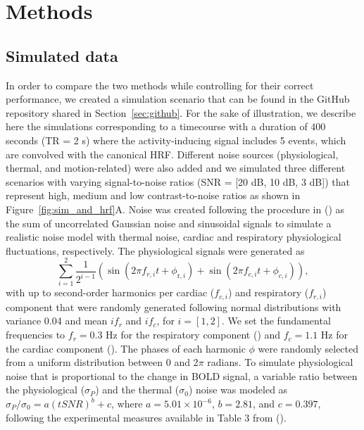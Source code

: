 
\section{Methods}
\label{sec:data}

\subsection{Simulated data}

In order to compare the two methods while controlling for their correct performance, we created a simulation scenario that can be found in the GitHub repository shared in Section~\ref{sec:github}. For the sake of illustration, we describe here the simulations corresponding to a timecourse with a duration of 400 seconds (TR = 2 s) where the activity-inducing signal includes 5 events, which are convolved with the canonical HRF. Different noise sources (physiological, thermal, and motion-related) were also added and we simulated three different scenarios with varying signal-to-noise ratios (SNR = [20 dB, 10 dB, 3 dB]) that represent high, medium and low contrast-to-noise ratios as shown in Figure~\ref{fig:sim_and_hrf}A. Noise was created following the procedure in (\citealt{Gaudes2013Paradigmfreemapping}) as the sum of uncorrelated Gaussian noise and sinusoidal signals to simulate a realistic noise model with thermal noise, cardiac and respiratory physiological fluctuations, respectively. The physiological signals were generated as
\begin{equation}
    \sum_{i=1}^{2} \frac{1}{2^{i-1}}\left(\sin \left(2 \pi f_{r, i} t+\phi_{\mathrm{r}, i}\right)+\sin \left(2 \pi f_{c, i} t+\phi_{c, i}\right)\right),
\end{equation}
with up to second-order harmonics per cardiac (\(f_{c,i}\)) and respiratory (\(f_{r,i}\)) component that were randomly generated following normal distributions with variance 0.04 and mean \(if_r\) and \(if_c\), for \(i = [1, 2]\). We set the fundamental frequencies to \(f_r = 0.3\) Hz for the respiratory component (\citealt{Birn2006Separatingrespiratoryvariation}) and \(f_c = 1.1\) Hz for the cardiac component (\citealt{Shmueli2007Lowfrequencyfluctuations}). The phases of each harmonic \(\phi\) were randomly selected from a uniform distribution between 0 and 2$\pi$ radians. To simulate physiological noise that is proportional to the change in BOLD signal, a variable ratio between the physiological (\(\sigma_P\)) and the thermal (\(\sigma_0\)) noise was modeled as \(\sigma_P/\sigma_0 = a(tSNR)^b + c\), where \(a = 5.01 \times 10^{-6}\), \(b = 2.81\), and \(c = 0.397\), following the experimental measures available in Table 3 from (\citealt{Triantafyllou2005Comparisonphysiologicalnoise}).


